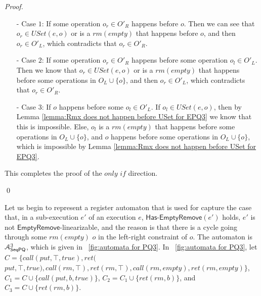 \begin {proof}
\begin{itemize}
\setlength{\itemsep}{0.5pt}
\item[-] Case $1$: If some operation $o_r \in O'_R$ happens before $o$. Then we can see that $o_r \in \textit{USet}(e,o)$ or is a $\textit{rm}(\textit{empty})$ that happens before $o$, and then $o_r \in O'_L$, which contradicts that $o_r \in O'_R$.

\item[-] Case $2$: If some operation $o_r \in O'_R$ happens before some operation $o_l \in O'_L$. Then we know that $o_r \in \textit{USet}(e,o)$ or is a $\textit{rm}(\textit{empty})$ that happens before some operations in $O_L \cup \{ o \}$, and then $o_r \in O'_L$, which contradicts that $o_r \in O'_R$.

\item[-] Case $3$: If $o$ happens before some $o_l \in O'_L$. If $o_l \in \textit{USet}(e,o)$, then by Lemma \ref{lemma:Rmx does not happen before USet for EPQ3} we know that this is impossible. Else, $o_l$ is a $\textit{rm}(\textit{empty})$ that happens before some operations in $O_L \cup \{ o \}$, and $o$ happens before some operations in $O_L \cup \{ o \}$, which is impossible by Lemma \ref{lemma:Rmx does not happen before USet for EPQ3}.
\end{itemize}

This completes the proof of the $\textit{only if}$ direction.

\qed
\end {proof}

Let us begin to represent a register automaton that is used for capture the case that, in a sub-execution $e'$ of an execution $e$, $\mathsf{Has\text{-}EmptyRemove}(e')$ holds, $e'$ is not $\mathsf{EmptyRemove}$-linearizable, and the reason is that there is a cycle going through some $\textit{rm}(\textit{empty})$ $o$ in the left-right constraint of $o$. The automaton is $\mathcal{A}_{\mathsf{SeqPQ}}^3$, which is given in \figurename~\ref{fig:automata for PQ3}. In \figurename~\ref{fig:automata for PQ3}, let $C = \{ \textit{call}(\textit{put},\top,\textit{true}),\textit{ret}($ $\textit{put},\top,\textit{true}), \textit{call}(\textit{rm},\top), \textit{ret}(\textit{rm},\top),\textit{call}(\textit{rm},\textit{empty}),\textit{ret}(\textit{rm},\textit{empty}) \}$, $C_1 = C \cup \{ \textit{call}(\textit{put},b,\textit{true}) \}$, $C_2 = C_1 \cup \{ \textit{ret}(\textit{rm},b) \}$, and $C_3 = C \cup \{ \textit{ret}(\textit{rm},b) \}$. 

